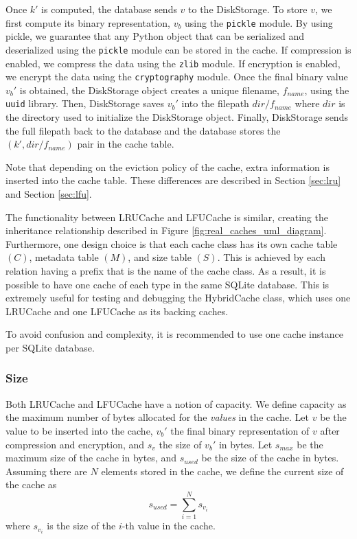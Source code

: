 \documentclass[11pt, journal]{IEEEtran}
\begin{document}
Once $k'$ is computed, the database sends $v$ to the DiskStorage.
To store $v$, we first
compute its binary representation, $v_b$ using the \texttt{pickle} module.
By using pickle, we guarantee that any Python object
that can be serialized and deserialized using
the \texttt{pickle} module can be stored in the cache.
If compression is enabled, we compress the data using the \texttt{zlib} module.
If encryption is enabled, we encrypt the data using the \texttt{cryptography}
module. Once the final binary value $v_b'$ is obtained,
the DiskStorage object creates a unique
filename, $f_{name}$, using the \texttt{uuid} library.
Then, DiskStorage saves $v_b'$ into the filepath $dir/f_{name}$ where $dir$ is the directory
used to initialize the DiskStorage object. Finally, DiskStorage sends the full filepath
back to the database and the database stores the $(k', dir/f_{name})$ pair in the cache table.

Note that depending on the eviction policy of the cache, extra information
is inserted into the cache table. These differences are described in
Section \ref{sec:lru} and Section \ref{sec:lfu}.

The functionality between LRUCache and LFUCache
is similar, creating the inheritance relationship described in Figure \ref{fig:real_caches_uml_diagram}.
Furthermore, one design choice is that each cache class has its own cache table $(C)$,
metadata table $(M)$, and size table $(S)$.
This is achieved by each relation having a prefix
that is the name of the cache class. As a result, it is possible to have
one cache of each type in the same SQLite database. This is extremely useful
for testing and debugging the HybridCache class,
which uses one LRUCache and one LFUCache
as its backing caches.

\begin{tcolorbox}[colback=blue!5!white, colframe=blue!75!black, title=Note]
    To avoid confusion and complexity, it is recommended to use
    one cache instance per SQLite database.
\end{tcolorbox}

\subsubsection{Size}
Both LRUCache and LFUCache have a notion of capacity. We define capacity
as the maximum number of bytes allocated for the \textit{values} in the cache.
Let $v$ be the value to be inserted into the cache, $v_b'$
the final binary representation of $v$ after compression and encryption,
and $s_v$ the size of $v_b'$ in bytes.
Let $s_{max}$ be the maximum size
of the cache in bytes, and $s_{used}$ be the size of the cache in bytes. Assuming
there are $N$ elements stored in the cache, we define the current size of the cache
as $$ s_{used} = \sum_{i=1}^{N} s_{v_i}$$
where $s_{v_i}$ is the size of the $i$-th value in the cache.
\end{document}

